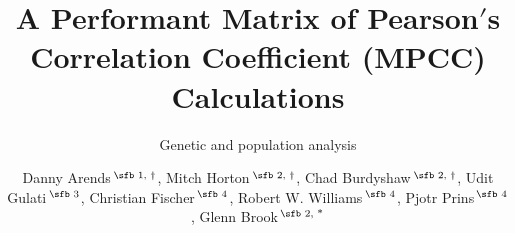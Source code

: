 \documentclass{bioinfo}
\begin{document}

\subtitle{Genetic and population analysis}

\title[MPCC]{A Performant Matrix of Pearson$'$s Correlation Coefficient (MPCC) Calculations}
\author[Arends \textit{et~al}.]{
Danny Arends\,$^{\text{\sfb 1, $\dagger$}}$,
Mitch Horton\,$^{\text{\sfb 2, $\dagger$}}$,
Chad Burdyshaw\,$^{\text{\sfb 2, $\dagger$}}$,
Udit Gulati\,$^{\text{\sfb 3}}$,
Christian Fischer\,$^{\text{\sfb 4}}$,
Robert W. Williams\,$^{\text{\sfb 4}}$,
Pjotr Prins\,$^{\text{\sfb 4}}$,
Glenn Brook\,$^{\text{\sfb 2, *}}$}
\address{$^{\text{\sf 1}}$Z{\"u}chtungsbiologie und molekulare
Genetik, Albrecht Daniel Thaer-Institut, Berlin, 10115, Germany \\
$^{\text{\sf 2}}$The Joint Institute for Computational Sciences,
University of Tennessee, Oak
Ridge, TN 37830, USA\\
$^{\text{\sf 3}}$Computer Science Dept. Indian Institute of
Information Technology, Una, Himachal Pradesh, India\\
$^{\text{\sf 4}}$Genetics, Genomics and Informatics, University
of Tennessee Health Science Center, Memphis, TN 38163, USA.}



\end{document}
